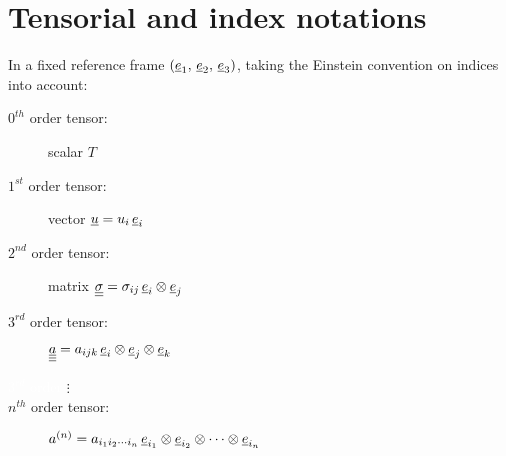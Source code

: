 \renewcommand{\arraystretch}{2.0}
\section{Tensorial and index notations}
In a fixed reference frame $ \left( \underline{e}_1 , \, \underline{e}_2 , \, \underline{e}_3  \right)$, taking the Einstein convention on indices into account:
%
\begin{description}
\item[$0^{th}$ order tensor: ] scalar $T$
\item[$1^{st}$ order tensor: ] vector $\underline{u} = u_i \, \underline{e}_i  $
\item[$2^{nd}$ order tensor: ] matrix $\underline{\underline{ \sigma}} =  \sigma_{ij}  \,\underline{e}_i \otimes \underline{e}_j$
\item[$3^{rd}$ order tensor: ] $\underline{\underline{\underline{a}}} = a_{ijk} \, \underline{e}_i \otimes \underline{e}_j  \otimes \underline{e}_k$
\item[\textcolor{white}{$3^{rd}$ order } $ \vdots $]
\item[$ n^{th} $ order tensor: ]$a^{(n)} = a_{i_1 i_2 \cdots i_n} \, \underline{e}_{i_1} \otimes \underline{e}_{i_2} \otimes \cdots  \otimes \underline{e}_{i_n}$
\end{description}

